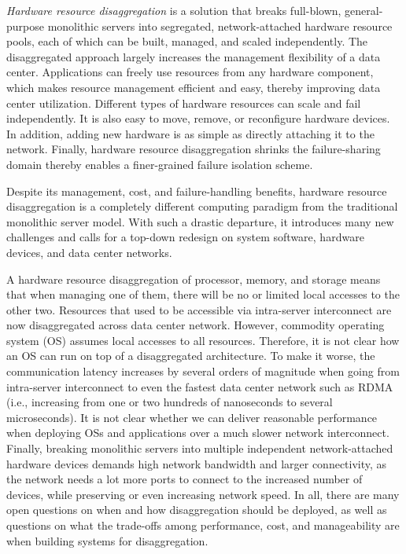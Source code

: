 \textit{Hardware resource disaggregation} is a solution that breaks full-blown, general-purpose monolithic servers into segregated, network-attached hardware resource pools,
each of which can be built, managed, and scaled independently.
%
The disaggregated approach largely increases the management flexibility of a data center.
Applications can freely use resources from any hardware component, which makes
resource management efficient and easy, thereby improving data center utilization.
Different types of hardware resources can scale and fail independently.
It is also easy to move, remove, or reconfigure hardware devices.
In addition, adding new hardware is as simple as directly attaching it to the network.
Finally, hardware resource disaggregation shrinks the failure-sharing domain thereby
enables a finer-grained failure isolation scheme.

Despite its management, cost, and failure-handling benefits,
hardware resource disaggregation is a completely different
computing paradigm from the traditional monolithic server model.
%
With such a drastic departure,
it introduces many new challenges and calls for a top-down redesign
on system software, hardware devices, and data center networks.

\fi
A hardware resource disaggregation of processor, memory, and
storage means that when managing one of them, there
will be no or limited local accesses to the other two.
Resources that used to be accessible via intra-server interconnect
are now disaggregated across data center network.
However, commodity operating system (OS) assumes local accesses to all resources.
Therefore, it is not clear how an OS can run on top of a disaggregated architecture.
%
To make it worse,
the communication latency increases by several orders of magnitude
when going from intra-server interconnect
to even the fastest data center network such as RDMA (i.e., increasing from one or two hundreds of nanoseconds to several microseconds).
It is not clear whether we can deliver reasonable performance when deploying
OSs and applications over a much slower network interconnect.
%
Finally, breaking monolithic servers into multiple independent network-attached
hardware devices demands high network bandwidth and larger connectivity, as the network needs a lot more ports to connect to the increased number of devices,
while preserving or even increasing network speed.
%
In all, there are many open questions on when and how disaggregation
should be deployed, as well as questions on what the trade-offs among performance, cost, and manageability are when building systems for disaggregation.

